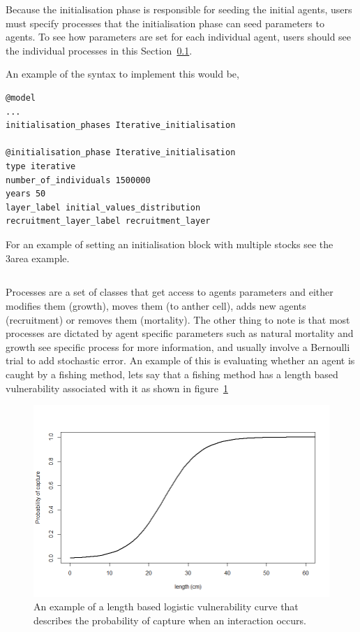 Because the initialisation phase is responsible for seeding the initial agents, users must specify processes that the initialisation phase can seed parameters to agents. To see how parameters are set for each individual agent, users should see the individual processes in this Section~\ref{sec:process}.

An example of the syntax to implement this would be,
{\small{\begin{verbatim}
@model
...
initialisation_phases Iterative_initialisation

@initialisation_phase Iterative_initialisation
type iterative
number_of_individuals 1500000
years 50
layer_label initial_values_distribution
recruitment_layer_label recruitment_layer
\end{verbatim}}}

For an example of setting an initialisation block with multiple stocks see the 3area example.


\subsection{}\label{sec:process}
Processes are a set of classes that get access to agents parameters and either modifies them (growth), moves them (to anther cell), adds new agents (recruitment) or removes them (mortality). The other thing to note is that most processes are dictated by agent specific parameters such as natural mortality and growth see specific process for more information, and usually involve a Bernoulli trial to add stochastic error. An example of this is evaluating whether an agent is caught by a fishing method, lets say that a fishing method has a length based vulnerability associated with it as shown in figure~\ref{fig:capture}


\begin{figure}[htp]\label{fig:capture}
	\centering
	\includegraphics[scale=0.6]{Figures/vulnerability.png}%
	\caption{An example of a length based logistic vulnerability curve that describes the probability of capture when an interaction occurs.}
\end{figure}

